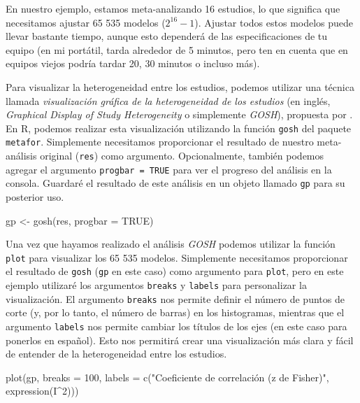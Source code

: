 \documentclass[
  bookmarksnumbered]{article}
\newenvironment{Shaded}{\begin{snugshade}}{\end{snugshade}}
\newcommand{\AttributeTok}[1]{\textcolor[rgb]{0.00,0.34,0.68}{#1}}
\newcommand{\ConstantTok}[1]{\textcolor[rgb]{0.67,0.33,0.00}{#1}}
\newcommand{\DecValTok}[1]{\textcolor[rgb]{0.69,0.50,0.00}{#1}}
\newcommand{\FunctionTok}[1]{\textcolor[rgb]{0.39,0.29,0.61}{#1}}
\newcommand{\NormalTok}[1]{\textcolor[rgb]{0.12,0.11,0.11}{#1}}
\newcommand{\OtherTok}[1]{\textcolor[rgb]{0.00,0.43,0.16}{#1}}
\newcommand{\SpecialCharTok}[1]{\textcolor[rgb]{0.24,0.68,0.91}{#1}}
\newcommand{\StringTok}[1]{\textcolor[rgb]{0.75,0.01,0.01}{#1}}
\begin{document}
En nuestro ejemplo, estamos meta-analizando 16 estudios, lo que significa que necesitamos ajustar 65 535 modelos (\(2^{16} - 1\)). Ajustar todos estos modelos puede llevar bastante tiempo, aunque esto dependerá de las especificaciones de tu equipo (en mi portátil, tarda alrededor de 5 minutos, pero ten en cuenta que en equipos viejos podría tardar 20, 30 minutos o incluso más).

Para visualizar la heterogeneidad entre los estudios, podemos utilizar una técnica llamada \emph{visualización gráfica de la heterogeneidad de los estudios} (en inglés, \emph{Graphical Display of Study Heterogeneity} o simplemente \emph{GOSH}), propuesta por \textcite{olkinGOSHGraphicalDisplay2012}. En R, podemos realizar esta visualización utilizando la función \texttt{gosh} del paquete \texttt{metafor}. Simplemente necesitamos proporcionar el resultado de nuestro meta-análisis original (\texttt{res}) como argumento. Opcionalmente, también podemos agregar el argumento \texttt{progbar\ =\ TRUE} para ver el progreso del análisis en la consola. Guardaré el resultado de este análisis en un objeto llamado \texttt{gp} para su posterior uso.

\begin{Shaded}
\begin{Highlighting}[]
\NormalTok{gp }\OtherTok{\textless{}{-}} \FunctionTok{gosh}\NormalTok{(res, }\AttributeTok{progbar =} \ConstantTok{TRUE}\NormalTok{)}
\end{Highlighting}
\end{Shaded}

Una vez que hayamos realizado el análisis \emph{GOSH} podemos utilizar la función \texttt{plot} para visualizar los 65 535 modelos. Simplemente necesitamos proporcionar el resultado de \texttt{gosh} (\texttt{gp} en este caso) como argumento para \texttt{plot}, pero en este ejemplo utilizaré los argumentos \texttt{breaks} y \texttt{labels} para personalizar la visualización. El argumento \texttt{breaks} nos permite definir el número de puntos de corte (y, por lo tanto, el número de barras) en los histogramas, mientras que el argumento \texttt{labels} nos permite cambiar los títulos de los ejes (en este caso para ponerlos en español). Esto nos permitirá crear una visualización más clara y fácil de entender de la heterogeneidad entre los estudios.

\begin{Shaded}
\begin{Highlighting}[]
\FunctionTok{plot}\NormalTok{(gp, }\AttributeTok{breaks =} \DecValTok{100}\NormalTok{,}
     \AttributeTok{labels =} \FunctionTok{c}\NormalTok{(}\StringTok{"Coeficiente de correlación (z de Fisher)"}\NormalTok{, }
                \FunctionTok{expression}\NormalTok{(I}\SpecialCharTok{\^{}}\DecValTok{2}\NormalTok{)))}
\end{Highlighting}
\end{Shaded}
\end{document}
